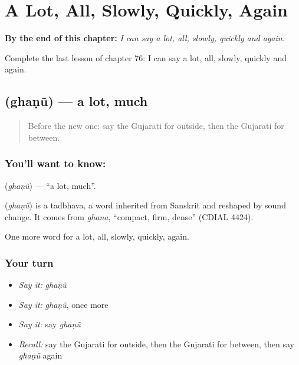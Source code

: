 
\chapter{A Lot, All, Slowly, Quickly, Again}
\label{ch:gu-a-lot-all-slowly-quickly-again}

\begin{chapteropening}
\textbf{By the end of this chapter:} \emph{I can say a lot, all, slowly, quickly and again.}

Complete the last lesson of chapter 76: I can say a lot, all, slowly, quickly and again.
\end{chapteropening}

\section[\texorpdfstring{\gu{ઘણું} (ghaṇũ)}{ઘણું (ghaṇũ)}]{ (ghaṇũ) — a lot, much}

\label{lesson:GU-C76-alot}



\begin{quote}
Before the new one: say the Gujarati for outside, then the Gujarati for between.
\end{quote}

\subsection*{You'll want to know: }
\textbf{} (\emph{ghaṇũ}) — \textquotedblleft{}a lot, much\textquotedblright{}.

\begin{cousinweb}
\textbf{} (\emph{ghaṇũ}) is a tadbhava, a word inherited from Sanskrit and reshaped by sound change. It comes from \emph{ghana}, \textquotedblleft{}compact, firm, dense\textquotedblright{} (CDIAL 4424).
\end{cousinweb}

\begin{grammarlens}[title={What you've built}]
One more word for a lot, all, slowly, quickly, again.
\end{grammarlens}

\subsection*{Your turn}
\begin{itemize}
\raggedright
  \item \emph{Say it:} \emph{ghaṇũ}
  \item \emph{Say it:} \emph{ghaṇũ}, once more
  \item \emph{Say it:} say \emph{ghaṇũ}
  \item \emph{Recall:} say the Gujarati for outside, then the Gujarati for between, then say \emph{ghaṇũ} again
\end{itemize}

